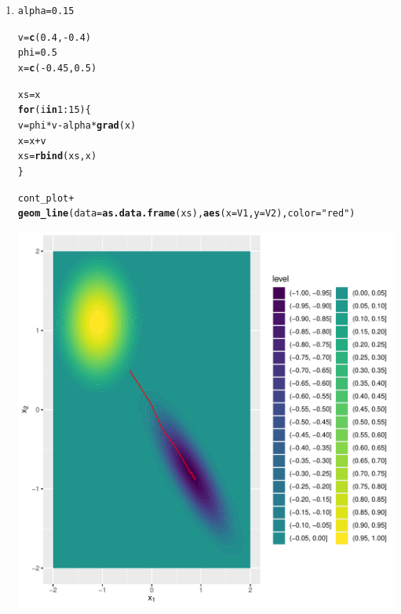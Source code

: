\documentclass[a4paper]{article}
\makeatletter
\newcommand{\hlnum}[1]{\textcolor[rgb]{0.686,0.059,0.569}{#1}}%
\newcommand{\hlstr}[1]{\textcolor[rgb]{0.192,0.494,0.8}{#1}}%
\newcommand{\hlopt}[1]{\textcolor[rgb]{0,0,0}{#1}}%
\newcommand{\hlstd}[1]{\textcolor[rgb]{0.345,0.345,0.345}{#1}}%
\newcommand{\hlkwa}[1]{\textcolor[rgb]{0.161,0.373,0.58}{\textbf{#1}}}%
\newcommand{\hlkwb}[1]{\textcolor[rgb]{0.69,0.353,0.396}{#1}}%
\newcommand{\hlkwc}[1]{\textcolor[rgb]{0.333,0.667,0.333}{#1}}%
\newcommand{\hlkwd}[1]{\textcolor[rgb]{0.737,0.353,0.396}{\textbf{#1}}}%
\newenvironment{kframe}{%
 \def\at@end@of@kframe{}%
 \ifinner\ifhmode%
  \def\at@end@of@kframe{\end{minipage}}%
  \begin{minipage}{\columnwidth}%
 \fi\fi%
 \def\FrameCommand##1{\hskip\@totalleftmargin \hskip-\fboxsep
 \colorbox{shadecolor}{##1}\hskip-\fboxsep
     \hskip-\linewidth \hskip-\@totalleftmargin \hskip\columnwidth}%
 \MakeFramed {\advance\hsize-\width
   \@totalleftmargin\z@ \linewidth\hsize
   \@setminipage}}%
 {\par\unskip\endMakeFramed%
 \at@end@of@kframe}
\newenvironment{knitrout}{}{} %
\makeatother
\begin{document}
{\begin{enumerate}
\item 

\begin{knitrout}
\color{fgcolor}\begin{kframe}
\begin{alltt}
\hlstd{alpha} \hlkwb{=} \hlnum{0.15}

\hlstd{v} \hlkwb{=} \hlkwd{c}\hlstd{(}\hlnum{0.4}\hlstd{,} \hlopt{-}\hlnum{0.4}\hlstd{)}
\hlstd{phi} \hlkwb{=} \hlnum{0.5}
\hlstd{x} \hlkwb{=} \hlkwd{c}\hlstd{(}\hlopt{-}\hlnum{0.45}\hlstd{,} \hlnum{0.5}\hlstd{)}

\hlstd{xs} \hlkwb{=} \hlstd{x}
\hlkwa{for} \hlstd{(i} \hlkwa{in} \hlnum{1}\hlopt{:}\hlnum{15}\hlstd{)\{}
  \hlstd{v} \hlkwb{=} \hlstd{phi} \hlopt{*} \hlstd{v} \hlopt{-} \hlstd{alpha}\hlopt{*}\hlkwd{grad}\hlstd{(x)}
  \hlstd{x} \hlkwb{=} \hlstd{x} \hlopt{+} \hlstd{v}
  \hlstd{xs} \hlkwb{=} \hlkwd{rbind}\hlstd{(xs, x)}
\hlstd{\}}

\hlstd{cont_plot} \hlopt{+}
  \hlkwd{geom_line}\hlstd{(}\hlkwc{data} \hlstd{=} \hlkwd{as.data.frame}\hlstd{(xs),} \hlkwd{aes}\hlstd{(}\hlkwc{x}\hlstd{=V1,} \hlkwc{y}\hlstd{=V2),} \hlkwc{color}\hlstd{=}\hlstr{"red"}\hlstd{)}
\end{alltt}
\end{kframe}
\includegraphics[width=0.5\linewidth]{figure/mv-gd_mom-1} 
\end{knitrout}


\end{enumerate}

}
\end{document}
